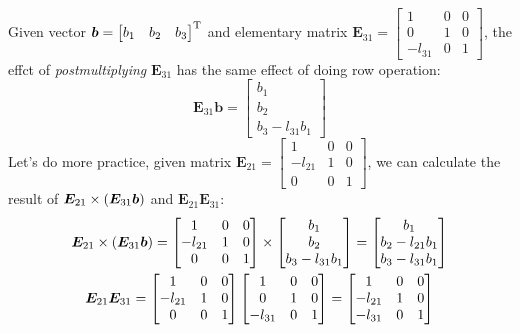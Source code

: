 \begin{example}
Given vector $\bm b=\begin{bmatrix}
b_1&b_2&b_3
\end{bmatrix}^{\mathrm T}$ and elementary matrix $\bm E_{31}=\begin{bmatrix}
1&0&0\\0&1&0\\-l_{31}&0&1
\end{bmatrix}$, the effct of \textit{postmultiplying} $\bm E_{31}$ has the same effect of doing row operation:
\[
\bm E_{31}\bm b=\begin{bmatrix}
b_1\\b_2\\b_3-l_{31}b_1
\end{bmatrix}
\]
Let’s do more practice, given matrix $\bm E_{21}=\begin{bmatrix}
1&0&0\\-l_{21}&1&0\\0&0&1
\end{bmatrix}$, we can calculate the result of $\bm E_{21}\times(\bm E_{31}\bm b)$ and $\bm E_{21}\bm E_{31}$:
\begin{gather*}
\bm E_{21}\x(\bm E_{31}\bm b)=\begin{bmatrix}
1&0&0\\-l_{21}&1&0\\0&0&1
\end{bmatrix}\times\begin{bmatrix}
b_1\\b_2\\b_3-l_{31}b_1
\end{bmatrix}=\begin{bmatrix}
b_1\\b_2-l_{21}b_1\\b_3-l_{31}b_1
\end{bmatrix}\\
\bm E_{21}\bm E_{31}=\begin{bmatrix}
1&0&0\\-l_{21}&1&0\\0&0&1
\end{bmatrix}\begin{bmatrix}
1&0&0\\0&1&0\\-l_{31}&0&1
\end{bmatrix}
=\begin{bmatrix}
1&0&0\\-l_{21}&1&0\\-l_{31}&0&1
\end{bmatrix}

\end{gather*}
\end{example}

